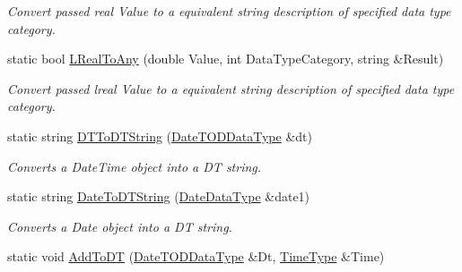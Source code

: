 \begin{DoxyCompactItemize}
\begin{DoxyCompactList}\small\item\em Convert passed real Value to a equivalent string description of specified data type category. \end{DoxyCompactList}\item 
static bool \hyperlink{classpc__emulator_1_1DataTypeUtils_a493525ae488d0d825858ea20701fd412}{L\+Real\+To\+Any} (double Value, int Data\+Type\+Category, string \&Result)\hypertarget{classpc__emulator_1_1DataTypeUtils_a493525ae488d0d825858ea20701fd412}{}\label{classpc__emulator_1_1DataTypeUtils_a493525ae488d0d825858ea20701fd412}

\begin{DoxyCompactList}\small\item\em Convert passed lreal Value to a equivalent string description of specified data type category. \end{DoxyCompactList}\item 
static string \hyperlink{classpc__emulator_1_1DataTypeUtils_ad9bd193c25786aea50df4b47dbd3b663}{D\+T\+To\+D\+T\+String} (\hyperlink{structpc__emulator_1_1DateTODDataType}{Date\+T\+O\+D\+Data\+Type} \&dt)\hypertarget{classpc__emulator_1_1DataTypeUtils_ad9bd193c25786aea50df4b47dbd3b663}{}\label{classpc__emulator_1_1DataTypeUtils_ad9bd193c25786aea50df4b47dbd3b663}

\begin{DoxyCompactList}\small\item\em Converts a Date\+Time object into a DT string. \end{DoxyCompactList}\item 
static string \hyperlink{classpc__emulator_1_1DataTypeUtils_a5ed4cdd86bd90996706c8c89f965f43b}{Date\+To\+D\+T\+String} (\hyperlink{structpc__emulator_1_1DateDataType}{Date\+Data\+Type} \&date1)\hypertarget{classpc__emulator_1_1DataTypeUtils_a5ed4cdd86bd90996706c8c89f965f43b}{}\label{classpc__emulator_1_1DataTypeUtils_a5ed4cdd86bd90996706c8c89f965f43b}

\begin{DoxyCompactList}\small\item\em Converts a Date object into a DT string. \end{DoxyCompactList}\item 
static void \hyperlink{classpc__emulator_1_1DataTypeUtils_a39040271d3313ca64ffd484cb76235e8}{Add\+To\+DT} (\hyperlink{structpc__emulator_1_1DateTODDataType}{Date\+T\+O\+D\+Data\+Type} \&Dt, \hyperlink{structpc__emulator_1_1TIMEDataType}{Time\+Type} \&Time)\hypertarget{classpc__emulator_1_1DataTypeUtils_a39040271d3313ca64ffd484cb76235e8}{}\label{classpc__emulator_1_1DataTypeUtils_a39040271d3313ca64ffd484cb76235e8}


\end{DoxyCompactItemize}
